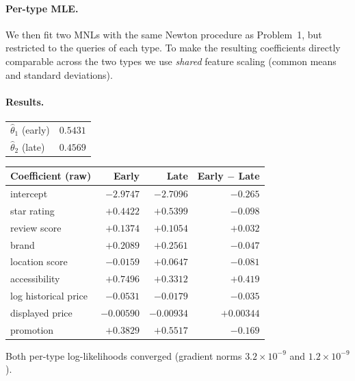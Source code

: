 \documentclass[11pt]{article}
\begin{document}
\paragraph{Per-type MLE.}
We then fit two MNLs with the same Newton procedure as Problem~1, but
restricted to the queries of each type. To make the resulting coefficients
directly comparable across the two types we use \emph{shared} feature scaling
(common means and standard deviations).

\paragraph{Results.}
\begin{center}
\begin{tabular}{lr}
\toprule
$\hat\theta_1$ (early) & $0.5431$ \\
$\hat\theta_2$ (late)  & $0.4569$ \\
\bottomrule
\end{tabular}
\end{center}

\medskip
\begin{center}
\begin{tabular}{lrrr}
\toprule
Coefficient (raw) & Early & Late & Early $-$ Late \\
\midrule
intercept                    & $-2.9747$ & $-2.7096$ & $-0.265$  \\
star rating                  & $+0.4422$ & $+0.5399$ & $-0.098$  \\
review score                 & $+0.1374$ & $+0.1054$ & $+0.032$  \\
brand                        & $+0.2089$ & $+0.2561$ & $-0.047$  \\
location score               & $-0.0159$ & $+0.0647$ & $-0.081$  \\
accessibility                & $+0.7496$ & $+0.3312$ & $+0.419$  \\
log historical price         & $-0.0531$ & $-0.0179$ & $-0.035$  \\
displayed price              & $-0.00590$ & $-0.00934$ & $+0.00344$ \\
promotion                    & $+0.3829$ & $+0.5517$ & $-0.169$  \\
\bottomrule
\end{tabular}
\end{center}

Both per-type log-likelihoods converged (gradient norms
$3.2\!\times\!10^{-9}$ and $1.2\!\times\!10^{-9}$).
\end{document}
